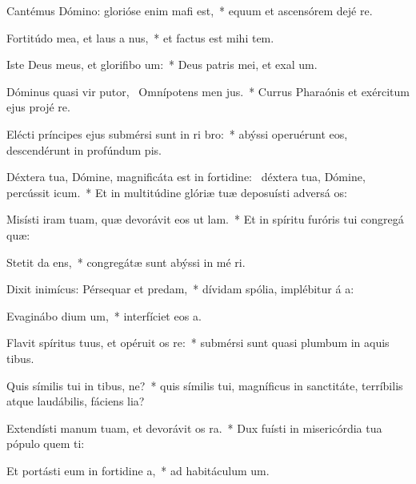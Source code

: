 \item Cantémus Dómino: glorióse enim mafi est,~* equum et ascensórem dejé  re.
\item Fortitúdo mea, et laus a nus,~* et factus est mihi  tem.
\item Iste Deus meus, et glorifibo um:~* Deus patris mei, et exal um.
\item Dóminus quasi vir putor,~\pscross{} Omnípotens men jus.~* Currus Pharaónis et exércitum ejus projé  re.
\item Elécti príncipes ejus submérsi sunt in ri bro:~* abýssi operuérunt eos, descendérunt in profúndum  pis.
\item Déxtera tua, Dómine, magnificáta est in fortidine:~\pscross{} déxtera tua, Dómine, percússit icum.~* Et in multitúdine glóriæ tuæ deposuísti adversá os:
\item Misísti iram tuam, quæ devorávit eos ut lam.~* Et in spíritu furóris tui congregá  quæ:
\item Stetit da ens,~* congregátæ sunt abýssi in mé ri.
\item Dixit inimícus: Pérsequar et predam,~* dívidam spólia, implébitur á a:
\item Evaginábo dium um,~* interfíciet eos  a.
\item Flavit spíritus tuus, et opéruit os re:~* submérsi sunt quasi plumbum in aquis tibus.
\item Quis símilis tui in tibus, ne?~* quis símilis tui, magníficus in sanctitáte, terríbilis atque laudábilis, fáciens lia?
\item Extendísti manum tuam, et devorávit os ra.~* Dux fuísti in misericórdia tua pópulo quem ti:
\item Et portásti eum in fortidine a,~* ad habitáculum  um.
